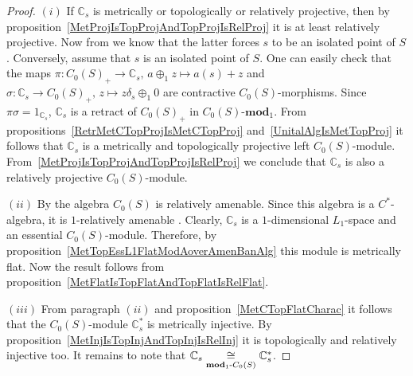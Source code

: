 \begin{proof} $(i)$ If $\mathbb{C}_s$ is metrically or topologically or
relatively projective, then by
proposition~\ref{MetProjIsTopProjAndTopProjIsRelProj} it is at least relatively
projective. Now from \cite[proposition 7.1.31]{HelBanLocConvAlg} we know that
the latter forces $s$ to be an isolated point of $S$. Conversely, assume that 
$s$ is an isolated point of $S$. One can easily check that the maps
$\pi:{C_0(S)}_+\to\mathbb{C}_s,\, a\oplus_1 z\mapsto a(s)+z$ and
$\sigma:\mathbb{C}_s\to {C_0(S)}_+,\, z\mapsto z\delta_s\oplus_1 0$ are contractive
$C_0(S)$-morphisms. Since $\pi\sigma=1_{\mathbb{C}_s}$, $\mathbb{C}_s$ is a
retract of ${C_0(S)}_+$ in $C_0(S)\text{-}\mathbf{mod}_1$. From
propositions~\ref{RetrMetCTopProjIsMetCTopProj} and~\ref{UnitalAlgIsMetTopProj} 
it follows that $\mathbb{C}_s$ is a metrically and topologically projective left
$C_0(S)$-module. From~\ref{MetProjIsTopProjAndTopProjIsRelProj} we conclude that
$\mathbb{C}_s$ is also a relatively projective $C_0(S)$-module.

$(ii)$ By \cite[theorem 7.1.87]{HelBanLocConvAlg} the algebra $C_0(S)$ is
relatively amenable. Since this algebra is a $C^*$-algebra, it is $1$-relatively 
amenable \cite[example 2]{RundeAmenConstFour}. Clearly, $\mathbb{C}_s$ is a
$1$-dimensional $L_1$-space and an essential $C_0(S)$-module. Therefore, by
proposition~\ref{MetTopEssL1FlatModAoverAmenBanAlg} this module is metrically
flat. Now the result follows from
proposition~\ref{MetFlatIsTopFlatAndTopFlatIsRelFlat}.

$(iii)$ From paragraph $(ii)$ and proposition~\ref{MetCTopFlatCharac} it follows
that the $C_0(S)$-module $\mathbb{C}_s^*$ is metrically injective. By
proposition~\ref{MetInjIsTopInjAndTopInjIsRelInj} it is topologically and
relatively injective too. It remains to note that
$\mathbb{C}_s\mathrel{\mathop{\cong}\limits_{\mathbf{mod}_1\text{-}C_0(S)}}\mathbb{C}_s^*$. 
\end{proof}

